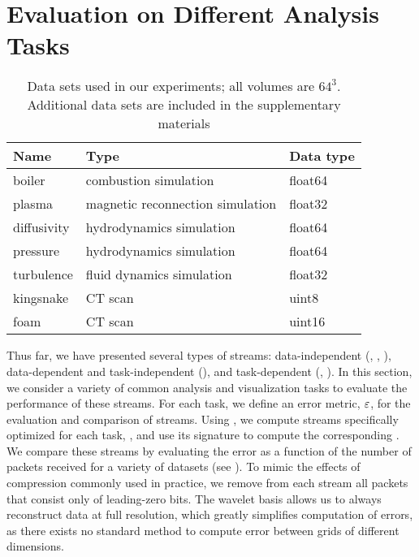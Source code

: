 \section{Evaluation on Different Analysis Tasks} \label{sec:analysis-tasks}

\begin{table}[b]
  \centering
	\begin{tabular}{l l l}
  \toprule
  Name & Type & Data type \\
  \midrule
  boiler & combustion simulation& float64\\
  plasma & magnetic reconnection simulation& float32\\
  diffusivity & hydrodynamics simulation& float64\\
  pressure & hydrodynamics simulation& float64\\
	turbulence & fluid dynamics simulation& float32\\
	kingsnake & CT scan & uint8\\
	foam & CT scan & uint16\\
  \bottomrule
  \end{tabular}\label{tbl:data-sets}
  \vspace{-0.5em}
   \caption{Data sets used in our experiments; all volumes are $64^3$. Additional data sets are 
   included in the supplementary materials}
\end{table}

Thus far, we have presented several types of streams: data-independent (\slvl, \sbit, \swav),
data-dependent and task-independent (\smag), and task-dependent (\sopt, \ssig). In this section, we
consider a variety of common analysis and visualization tasks to evaluate the performance of these
streams. For each task, we define an error metric, $\err$, for the evaluation and comparison of
streams. Using , we compute streams specifically optimized for each task, \stkop,
and use its signature to compute the corresponding \stksg. We compare these streams by evaluating
the error as a function of the number of packets received for a variety of datasets (see
). To mimic the effects of compression commonly used in practice, we remove from
each stream all packets that consist only of leading-zero bits. The wavelet basis allows us to
always reconstruct data at full resolution, which greatly simplifies computation of errors, as there
exists no standard method to compute error between grids of different dimensions.

